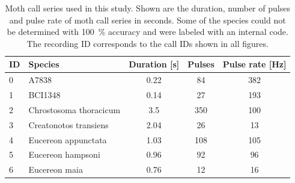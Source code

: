 \documentclass[12pt,a4paper]{article}
\newcommand{\percent}[1]{#1~$\%$}
\begin{document}
\begin{table}[p]
	\centering
	\caption{Moth call series used in this study. Shown are the duration, number of pulses and pulse rate of moth call series in seconds. Some of the species could not be determined with \percent{100} accuracy and were labeled with an internal code. The recording ID corresponds to the call IDs shown in all figures.}
	\setlength{\tabcolsep}{10pt} %
	\renewcommand{\arraystretch}{1.5} %
	\label{tab:CS}
\begin{tabular}{llccc}
	\rowcolor[HTML]{EFEFEF} 
	ID & {\color[HTML]{000000} Species} & \multicolumn{1}{l}{\cellcolor[HTML]{EFEFEF}Duration {[}s{]}} & \multicolumn{1}{l}{\cellcolor[HTML]{EFEFEF}Pulses} & \multicolumn{1}{l}{\cellcolor[HTML]{EFEFEF}Pulse rate {[}Hz{]}} \\ \hline
	0  & A7838                          & 0.22                                                         & 84                                                 & 382                                                             \\
	1  & BCI1348                        & 0.14                                                         & 27                                                 & 193                                                             \\
	2  & Chrostosoma thoracicum         & 3.5                                                          & 350                                                & 100                                                             \\
	3  & Creatonotos transiens          & 2.04                                                         & 26                                                 & 13                                                              \\
	4  & Eucereon appunctata            & 1.03                                                         & 108                                                & 105                                                             \\
	5  & Eucereon hampsoni              & 0.96                                                         & 92                                                 & 96                                                              \\
	6  & Eucereon maia                  & 0.76                                                         & 12                                                 & 16                                                              \\

\end{tabular}
\end{table}
\end{document}
